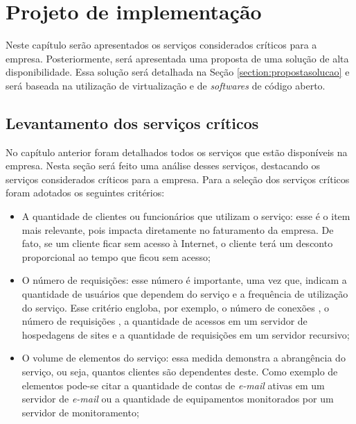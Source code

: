 \chapter{Projeto de implementação}
\label{cap:projetoimplementacao}

Neste capítulo serão apresentados os serviços considerados críticos para a empresa. Posteriormente, será apresentada uma proposta de uma solução 
de alta disponibilidade. Essa solução será detalhada na Seção \ref{section:propostasolucao} e será baseada na utilização de virtualização e 
de \textit{softwares} de código aberto. 

\section{Levantamento dos serviços críticos}
\label{section:servcrit}

No capítulo anterior foram detalhados todos os serviços que estão disponíveis na empresa. Nesta seção será feito uma análise desses
serviços, destacando os serviços considerados críticos para a empresa. Para a seleção dos serviços críticos foram adotados os seguintes
critérios:
\begin{itemize}
 \item A quantidade de clientes ou funcionários que utilizam o serviço: esse é o item mais relevante, pois impacta diretamente no faturamento
 da empresa. De fato, se um cliente ficar sem acesso à Internet, o cliente terá um desconto proporcional ao tempo que ficou sem 
 acesso; 
 \item O número de requisições: esse número é importante, uma vez que, indicam a quantidade de usuários que dependem do serviço e a frequência
 de utilização do serviço. Esse critério engloba, por exemplo, o número de conexões  \cite{tanenbaum2011}, o número de requisições 
  \cite{tanenbaum2011}, a quantidade de acessos em um servidor de hospedagens de sites e a quantidade de requisições  
 em um servidor recursivo;
 \item O volume de elementos do serviço: essa medida demonstra a abrangência do serviço, ou seja, quantos clientes são dependentes deste. 
 Como exemplo de elementos pode-se citar a quantidade de contas de \textit{e-mail} ativas em um servidor de \textit{e-mail} ou a quantidade de 
 equipamentos monitorados por um servidor de monitoramento;
\end{itemize}

